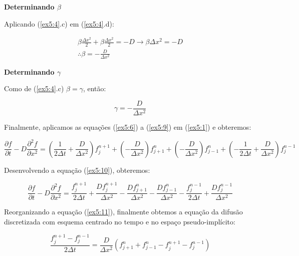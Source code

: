 \documentclass[11pt]{article}
\begin{document}
\textbf{Determinando \(\beta\)}

Aplicando (\ref{ex5:4}.c) em (\ref{ex5:4}.d):

\begin{equation}
    \begin{aligned}
        \beta{\frac{\Delta{x^2}}{2}} + \beta{\frac{\Delta{x^2}}{2}} = -D \to \beta{\Delta{x^2}} = -D \\ 
        \therefore \beta = -\frac{D}{\Delta{x^2}}
    \end{aligned}
    \label{ex5:8}
\end{equation}

\textbf{Determinando \(\gamma\)}

Como de (\ref{ex5:4}.c) \(\beta = \gamma\), então:

\begin{equation}
    \gamma = -\frac{D}{\Delta{x^2}}
    \label{ex5:9}
\end{equation}

Finalmente, aplicamos as equações (\ref{ex5:6}) a (\ref{ex5:9}) em
(\ref{ex5:1}) e obteremos:

\begin{equation}
\frac{\partial{f}}{\partial{t}} - D\frac{\partial^2{f}}{\partial{x^2}} = 
    (\frac{1}{2\Delta{t}} + \frac{D}{\Delta{x^2}})f^{n+1}_{j} + 
    (-\frac{D}{\Delta{x^2}})f^{n}_{j+1} + 
    (-\frac{D}{\Delta{x^2}})f^{n}_{j-1} + 
    (-\frac{1}{2\Delta{t}} + \frac{D}{\Delta{x^2}})f^{n-1}_{j}
    \label{ex5:10}
\end{equation}

Desenvolvendo a equação (\ref{ex5:10}), obteremos:

\begin{equation}
    \frac{\partial{f}}{\partial{t}} - D\frac{\partial^2{f}}{\partial{x^2}} = 
    \frac{f^{n+1}_{j}}{2\Delta{t}} + \frac{Df^{n+1}_{j}}{\Delta{x^2}} -
    \frac{Df^{n}_{j+1}}{\Delta{x^2}} - \frac{Df^{n}_{j-1}}{\Delta{x^2}} -
    \frac{f^{n-1}_{j}}{2\Delta{t}} + \frac{Df^{n-1}_{j}}{\Delta{x^2}} 
    \label{ex5:11}
\end{equation}

Reorganizando a equação (\ref{ex5:11}), finalmente obtemos a equação da
difusão discretizada com esquema centrado no tempo e no espaço
pseudo-implícito:

\begin{equation}
    \frac{f^{n+1}_{j} - f^{n-1}_{j}}{2\Delta{t}} = 
    \frac{D}{\Delta{x^2}}(f^{n}_{j+1} + f^{n}_{j-1} - f^{n+1}_{j} - f^{n-1}_{j})
    \label{ex5:12}
\end{equation}
\end{document}
